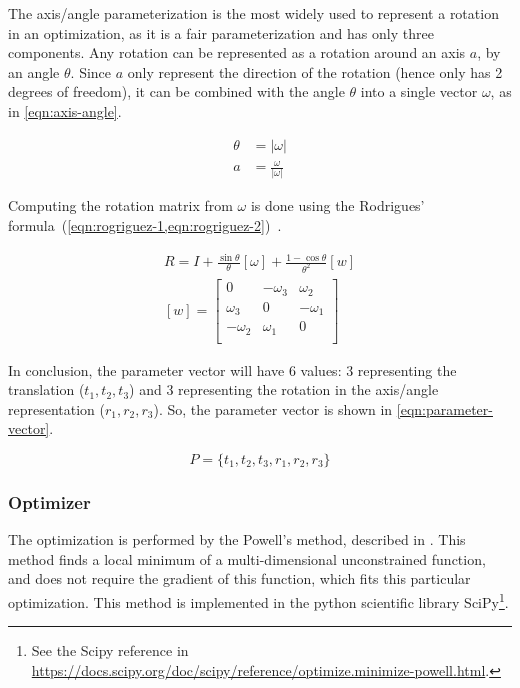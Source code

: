 The axis/angle parameterization is the most widely used to represent a rotation in an optimization, as it is a fair parameterization and has only three components. Any rotation can be represented as a rotation around an axis $a$, by an angle $\theta$. Since $a$ only represent the direction of the rotation (hence only has 2 degrees of freedom), it can be combined with the angle $\theta$ into a single vector $\omega$, as in \cref{eqn:axis-angle}.

\begin{equation}
    \label{eqn:axis-angle}
    \begin{aligned}
        \theta & = |\omega| \\
        a & = \frac{\omega}{|\omega|}
    \end{aligned}
\end{equation}

Computing the rotation matrix from $\omega$ is done using the Rodrigues' formula~(\cref{eqn:rogriguez-1,eqn:rogriguez-2})~\cite{schmidt01}.

\begin{align}
    \label{eqn:rogriguez-1}
    R = I + \frac{\sin \theta}{\theta} [\omega] + \frac{1 - \cos \theta}{\theta^2} [w] \\
    \label{eqn:rogriguez-2}
    [w] = \left[
        \begin{array}{ccc}
            0  & -\omega_3 & \omega_2 \\
            \omega_3 & 0   & -\omega_1 \\
            -\omega_2 & \omega_1 & 0 \\
        \end{array}
    \right]
\end{align}

In conclusion, the parameter vector will have 6 values: 3 representing the translation ($t_1, t_2, t_3$) and 3 representing the rotation in the axis/angle representation ($r_1, r_2, r_3$). So, the parameter vector is shown in \cref{eqn:parameter-vector}.

\begin{equation}
    \label{eqn:parameter-vector}
    P = \{t_1, t_2, t_3, r_1, r_2, r_3\}
\end{equation}

\subsubsection{Optimizer}

The optimization is performed by the Powell's method, described in \cite{powell_method}. This method finds a local minimum of a multi-dimensional unconstrained function, and does not require the gradient of this function, which fits this particular optimization. This method is implemented in the python scientific library SciPy\footnote{See the Scipy reference in \url{https://docs.scipy.org/doc/scipy/reference/optimize.minimize-powell.html}.}.

